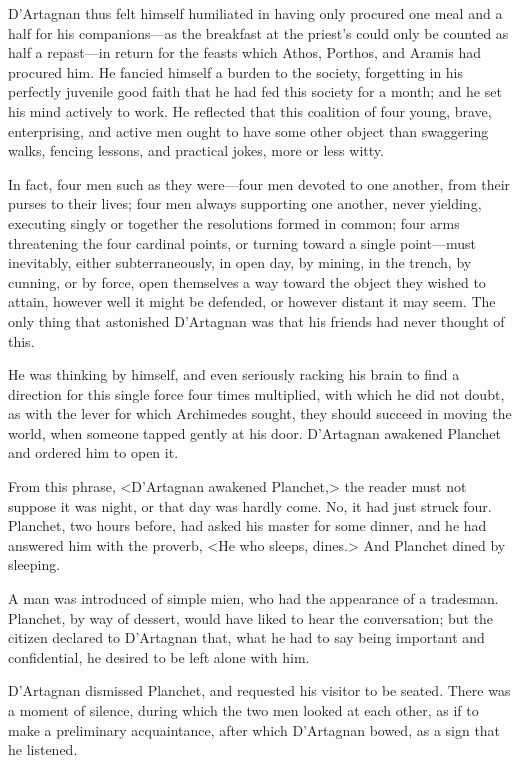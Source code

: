 D'Artagnan thus felt himself humiliated in having only procured one meal and a half for his companions—as the breakfast at the priest's could only be counted as half a repast—in return for the feasts which Athos, Porthos, and Aramis had procured him. He fancied himself a burden to the society, forgetting in his perfectly juvenile good faith that he had fed this society for a month; and he set his mind actively to work. He reflected that this coalition of four young, brave, enterprising, and active men ought to have some other object than swaggering walks, fencing lessons, and practical jokes, more or less witty. 

In fact, four men such as they were—four men devoted to one another, from their purses to their lives; four men always supporting one another, never yielding, executing singly or together the resolutions formed in common; four arms threatening the four cardinal points, or turning toward a single point—must inevitably, either subterraneously, in open day, by mining, in the trench, by cunning, or by force, open themselves a way toward the object they wished to attain, however well it might be defended, or however distant it may seem. The only thing that astonished D'Artagnan was that his friends had never thought of this. 

He was thinking by himself, and even seriously racking his brain to find a direction for this single force four times multiplied, with which he did not doubt, as with the lever for which Archimedes sought, they should succeed in moving the world, when someone tapped gently at his door. D'Artagnan awakened Planchet and ordered him to open it. 

From this phrase, <D'Artagnan awakened Planchet,> the reader must not suppose it was night, or that day was hardly come. No, it had just struck four. Planchet, two hours before, had asked his master for some dinner, and he had answered him with the proverb, <He who sleeps, dines.> And Planchet dined by sleeping. 

A man was introduced of simple mien, who had the appearance of a tradesman. Planchet, by way of dessert, would have liked to hear the conversation; but the citizen declared to D'Artagnan that, what he had to say being important and confidential, he desired to be left alone with him. 

D'Artagnan dismissed Planchet, and requested his visitor to be seated. There was a moment of silence, during which the two men looked at each other, as if to make a preliminary acquaintance, after which D'Artagnan bowed, as a sign that he listened. 

